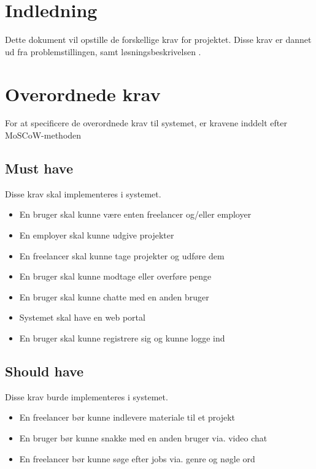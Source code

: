 \chapter{Indledning}

Dette dokument vil opstille de forskellige krav for projektet. Disse krav er dannet ud fra problemstillingen, samt løsningsbeskrivelsen \cite{documents-issue-statement}.

\chapter{Overordnede krav}

For at specificere de overordnede krav til systemet, er kravene inddelt efter MoSCoW-methoden ~\cite{moscow}

\section{Must have}

Disse krav skal implementeres i systemet.

\begin{itemize}
    \item En bruger skal kunne være enten freelancer og/eller employer
    \item En employer skal kunne udgive projekter
    \item En freelancer skal kunne tage projekter og udføre dem
    \item En bruger skal kunne modtage eller overføre penge
    \item En bruger skal kunne chatte med en anden bruger
    \item Systemet skal have en web portal
    \item En bruger skal kunne registrere sig og kunne logge ind
\end{itemize}

\section{Should have}

Disse krav burde implementeres i systemet.

\begin{itemize}
    \item En freelancer bør kunne indlevere materiale til et projekt
    \item En bruger bør kunne snakke med en anden bruger via. video chat
    \item En freelancer bør kunne søge efter jobs via. genre og nøgle ord
\end{itemize}

